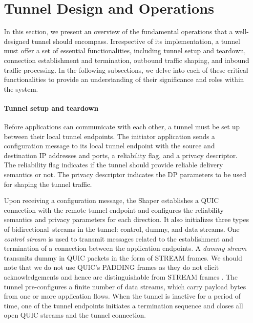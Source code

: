 \section{Tunnel Design and Operations}\label{sec:tunnel-design}
In this section, we present an overview of the fundamental operations that a well-designed {\sys} tunnel should encompass.
Irrespective of its implementation, a {\sys} tunnel must offer a set of essential functionalities, including tunnel setup and teardown, connection establishment and termination, outbound traffic shaping, and inbound traffic processing. 
In the following subsections, we delve into each of these critical functionalities to provide an understanding of their significance and roles within the system.

\paragraph{Tunnel setup and teardown}
Before applications can communicate with each other, a {\sys} tunnel must be set up between their local tunnel endpoints.
The initiator application sends a configuration message to its local tunnel endpoint with the source and destination IP addresses and ports, a reliability flag, and a privacy descriptor.
The reliability flag indicates if the tunnel should provide reliable delivery semantics or not.
The privacy descriptor indicates the DP parameters to be used for shaping the tunnel traffic.

Upon receiving a configuration message, the Shaper establishes a QUIC connection with the remote tunnel endpoint and configures the reliability semantics and privacy parameters for each direction.
It also initializes three types of bidirectional~streams in the tunnel: control, dummy, and data streams.
One {\em control stream} is used to transmit messages related to the establishment and termination of a connection between the application endpoints. A
{\em dummy stream} transmits dummy in QUIC packets in the form of STREAM frames.
We should note that we do not use QUIC's PADDING frames as they do not elicit acknowledgements and hence are distinguishable from STREAM frames \cite{rfc9000}.
The tunnel pre-configures a finite number of data streams, which carry payload bytes from one or more application flows.
When the tunnel is inactive for a period of time, one of the tunnel endpoints initiates a termination sequence and closes all open QUIC streams and the tunnel connection.

